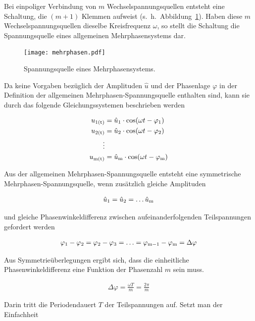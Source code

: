 Bei einpoliger Verbindung von $m$ Wechselspannungsquellen entsteht eine Schaltung, die $(m+1)$ Klemmen aufweist (s.~h.~Abbildung~\ref{fig:mehrphasen}).
Haben diese $m$ Wechselspannungsquellen dieselbe Kreisfrequenz $\omega$, so stellt die Schaltung die Spannungsquelle eines allgemeinen Mehrphasensystems dar.

\begin{figure}[!h]
\centering
\texttt{[image: mehrphasen.pdf]}
\label{fig:mehrphasen}
\caption{Spannungsquelle eines Mehrphasensystems.}
\end{figure}

Da keine Vorgaben bezüglich der Amplituden $\hat{u}$ und der Phasenlage $\varphi$ in der Definition der allgemeinen Mehrphasen-Spannungsquelle enthalten sind, kann sie \zB durch das folgende Gleichungssystemen beschrieben werden

\begin{align}
u_{\mathrm{1(t)}} &= \hat{u}_{\mathrm{1}} \cdot \cos(\omega t - \varphi_{\mathrm{1}}) \\
u_{\mathrm{2(t)}} &= \hat{u}_{\mathrm{2}} \cdot \cos(\omega t - \varphi_{\mathrm{2}}) \nonumber  \\
\vdots \nonumber \\
u_{\mathrm{m(t)}} &= \hat{u}_{\mathrm{m}} \cdot \cos(\omega t - \varphi_{\mathrm{m}}) \nonumber
\end{align}

Aus der allgemeinen Mehrphasen-Spannungsquelle entsteht eine symmetrische Mehrphasen-Spannungsquelle, wenn zusätzlich gleiche Amplituden

\begin{align*}
\hat{u}_{\mathrm{1}} = \hat{u}_{\mathrm{2}} = \ldots \hat{u}_{\mathrm{m}}
\end{align*}

und gleiche Phasenwinkeldifferenz zwischen aufeinanderfolgenden Teilspannungen gefordert werden

\begin{align*}
\varphi_{\mathrm{1}} - \varphi_{\mathrm{2}} = \varphi_{\mathrm{2}} - \varphi_{\mathrm{3}} = \ldots = \varphi_{\mathrm{m-1}} - \varphi_{\mathrm{m}} = \Delta \varphi
\end{align*}

Aus Symmetrieüberlegungen ergibt sich, dass die einheitliche Phasenwinkeldifferenz eine Funktion der Phasenzahl $m$ sein muss.

\begin{align}
\Delta \varphi = \frac{\omega T}{m} = \frac{2\pi}{m}
\end{align}

Darin tritt die Periodendauert $T$ der Teilspannungen auf.
Setzt man der Einfachheit

